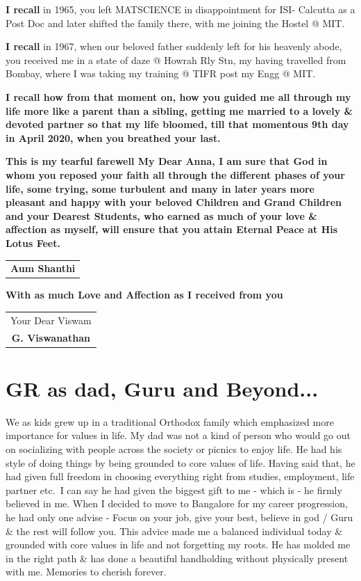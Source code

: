 \textbf{I recall} in 1965, you left MATSCIENCE in disappointment for ISI- Calcutta as a Post Doc and later shifted the family there, with me joining the Hostel @ MIT.

\textbf{I recall} in 1967, when our beloved father suddenly left for his heavenly abode, you received me in a state of daze @ Howrah Rly Stn, my having travelled from Bombay, where I was taking my training @ TIFR post my Engg @ MIT.

\textbf{I recall how from that moment on, how you guided me all through my life more like a parent than a sibling, getting me married to a lovely \& devoted partner so that my life bloomed, till that momentous 9th day in April 2020, when you breathed your last.}

\textbf{This is my tearful farewell My Dear Anna, I am sure that God in whom you reposed your faith all through the different phases of your life, some trying, some turbulent and many in later years more pleasant and happy with your beloved Children and Grand Children and your Dearest Students, who earned as much of your love \& affection as myself, will ensure that you attain Eternal Peace at His Lotus Feet. } 
\bigskip


\begin{flushright}
\begin{tabular}{c}
\textbf{Aum Shanthi}
\end{tabular}
\end{flushright}
\bigskip

\noindent 
\textbf{With as much Love and Affection as I received from you}
\bigskip

\begin{flushright}
\begin{tabular}{c}
Your Dear Viswam\\
\textbf{G. Viswanathan}
\end{tabular}
\end{flushright}
\bigskip

\section*{GR as dad, Guru and Beyond...}

We as kids grew up in a traditional Orthodox family which emphasized more importance for values in life. My dad was not a kind of person who would go out on socializing with people across the society or picnics to enjoy life. He had his style of doing things by being grounded to core values of life. Having said that, he had given full freedom in choosing everything right from studies, employment, life partner etc.\ I can say he had given the biggest gift to me - which is - he firmly believed in me. When I decided to move to Bangalore for my career progression, he had only one advise - Focus on your job, give your best, believe in god / Guru \& the rest will follow you. This advice made me a balanced individual today \& grounded with core values in life and not forgetting my roots. He has molded me in the right path \& has done a beautiful handholding without physically present with me. Memories to cherish forever.
\bigskip

